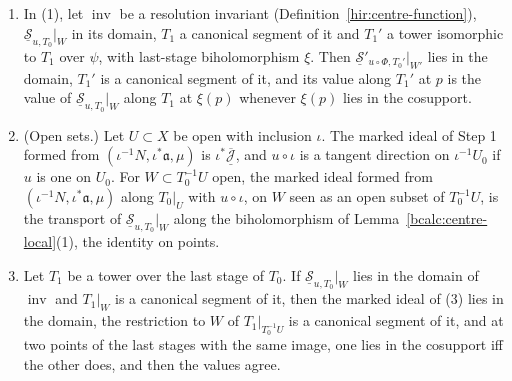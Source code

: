 \begin{theorem}
\begin{enumerate}
\(\underline{\mathcal S}'\) is formed from \((\Phi^{-1}N,\Phi^*\mathfrak a,\mu)\). For \(\Phi=\mathrm{id}\) this reads
\(\underline{\mathcal S}_{u,T_0'}|_{W'}=\psi^*\bigl(\underline{\mathcal S}_{u,T_0}|_W\bigr)\).
\item In (1), let \(\operatorname{inv}\) be a resolution invariant (Definition~\ref{hir:centre-function}), \(\underline{\mathcal S}_{u,T_0}|_W\) in its domain, \(T_1\) a canonical
segment of it and \(T_1'\) a tower isomorphic to \(T_1\) over \(\psi\), with last-stage biholomorphism \(\xi\). Then \(\underline{\mathcal S}'_{u\circ\Phi,T_0'}|_{W'}\) lies
in the domain, \(T_1'\) is a canonical segment of it, and its value along \(T_1'\) at \(p\) is the value of \(\underline{\mathcal S}_{u,T_0}|_W\) along \(T_1\) at
\(\xi(p)\) whenever \(\xi(p)\) lies in the cosupport.
\item (Open sets.) Let \(U\subset X\) be open with inclusion \(\iota\). The marked ideal of Step 1 formed from \((\iota^{-1}N,\iota^*\mathfrak a,\mu)\) is
\(\iota^*\overline{\underline{\mathcal J}}\), and \(u\circ\iota\) is a tangent direction on \(\iota^{-1}U_0\) if \(u\) is one on \(U_0\). For \(W\subset T_0^{-1}U\) open, the
marked ideal formed from \((\iota^{-1}N,\iota^*\mathfrak a,\mu)\) along \(T_0|_U\) with \(u\circ\iota\), on \(W\) seen as an open subset of \(T_0^{-1}U\), is the transport of
\(\underline{\mathcal S}_{u,T_0}|_W\) along the biholomorphism of Lemma~\ref{bcalc:centre-local}(1), the identity on points.
\item Let \(T_1\) be a tower over the last stage of \(T_0\). If \(\underline{\mathcal S}_{u,T_0}|_W\) lies in the domain of \(\operatorname{inv}\) and \(T_1|_W\) is a canonical
segment of it, then the marked ideal of (3) lies in the domain, the restriction to \(W\) of \(T_1|_{T_0^{-1}U}\) is a canonical segment of it, and at two points of the
last stages with the same image, one lies in the cosupport iff the other does, and then the values agree.
\end{enumerate}
\end{theorem}

